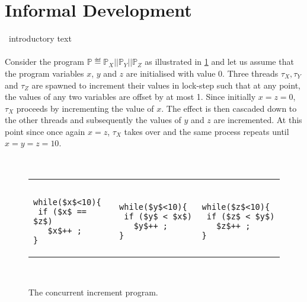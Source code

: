 \section{Informal Development}\label{sec:intuition}
\todo\ introductory text\\\\
Consider the program $\mathbb{P} \eqdef \mathbb{P}_X || \mathbb{P}_Y || \mathbb{P}_Z$ as illustrated in \fig\ref{fig:concurrentInc} and let us assume that the program variables $x$, $y$ and $z$ are initialised with value $0$. Three threads $\tau_X, \tau_Y$ and $\tau_Z$ are spawned to increment their values in lock-step such that at any point, the values of any two variables are offset by at most 1. Since initially $x=z=0$, $\tau_X$ proceeds by incrementing the value of $x$. The effect is then cascaded down to the other threads and subsequently the values of $y$ and $z$ are incremented. At this point since once again $x = z$, $\tau_X$ takes over and the same process repeats until $x = y = z = 10$. 
%
%
\begin{figure}
\noindent\makebox[\linewidth]{\rule{\linewidth}{1pt}} \vspace*{-5pt}\\
\hspace*{-0.2cm}
\begin{tabular}{l || l || l}
	\color{blue}{$\mathbb{P}_X$ :}& 
	\color{blue}{$\mathbb{P}_Y$ :}& 
	\color{blue}{$\mathbb{P}_Z$ :} \\
	 &&\vspace*{-5pt}\\
\begin{lstlisting}[mathescape]
while($x$<10){
 if ($x$ == $z$) 
   $x$++ ;
}
\end{lstlisting}
&
\begin{lstlisting}[mathescape]
while($y$<10){
 if ($y$ < $x$) 
   $y$++ ;
}
\end{lstlisting}
&
\begin{lstlisting}[mathescape]
while($z$<10){
 if ($z$ < $y$) 
   $z$++ ;
}
\end{lstlisting}

\end{tabular} \vspace*{5pt}\\
\noindent\makebox[\linewidth]{\rule{\linewidth}{1pt}} \vspace*{-12pt}
\caption{The concurrent increment program.}
\label{fig:concurrentInc}
\end{figure}
%
%
%
%
